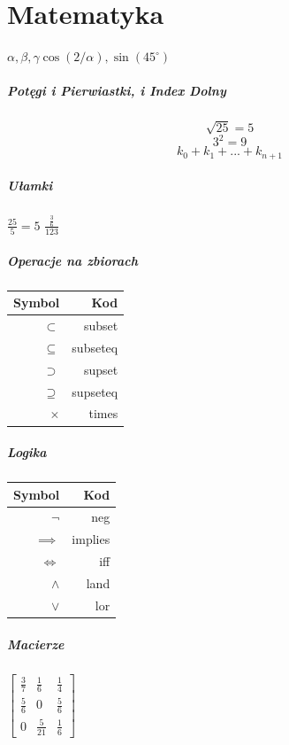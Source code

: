\documentclass[a4paper]{article}
\begin{document}
\section{Matematyka}
\begin{math}
\alpha, \beta,  \gamma
\cos (2/\alpha), \sin (45^\circ )
\end{math}
\subparagraph{Potęgi i Pierwiastki, i Index Dolny}

$$ \sqrt{25} = 5 $$
$$ 3^2 = 9 $$
$$ k_0 + k_1 + ... + k_{n+1} $$ %

\subparagraph{Ułamki}
$ \frac{25}{5} = 5 $ \newline
$ \frac{\frac{3}{6}}{123} $
\subparagraph{Operacje na zbiorach}
\begin{tabular}{| r | r |}
\hline
Symbol & Kod \\
\hline
$ \subset $ & subset \\
\hline
$ \subseteq $ & subseteq \\
\hline
$ \supset $ & supset \\
\hline
$ \supseteq $ & supseteq \\
\hline 
$ \times $ & times \\
\hline
\end{tabular}
\subparagraph{Logika}
\begin{tabular}{|r|r|}
\hline
Symbol & Kod \\
\hline
$ \neg $ & neg \\ %
\hline
$ \implies $ & implies \\ %
\hline
$ \iff $ & iff \\ %
\hline
$ \land $ & land \\	%
\hline 
$ \lor $ & lor \\ %
\hline
\end{tabular}
\subparagraph{Macierze}
\begin{math}
\begin{bmatrix}
       \frac{3}{7} & \frac{1}{6} & \frac{1}{4} \\[0.3em]
       \frac{5}{6} & 0           & \frac{5}{6} \\[0.3em]
       0           & \frac{5}{21} & \frac{1}{6}
     \end{bmatrix} 
\end{math}
\end{document}
